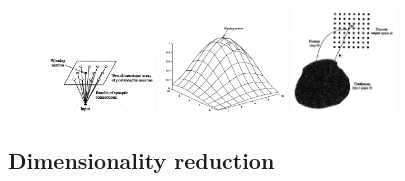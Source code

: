 \documentclass{article}
\begin{document}
\begin{figure}[H]
    \centering
    \includegraphics[width=0.25\textwidth]{self-organizing-maps.png}
    \includegraphics[width=0.3\textwidth]{self-organizing-maps2.png}
    \includegraphics[width=0.25\textwidth]{self-organizing-maps3.png}
    \caption{}
\end{figure}

\subsection{Dimensionality reduction}
\end{document}
